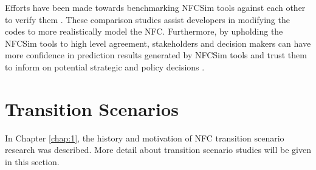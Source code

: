Efforts have been made towards benchmarking \gls{NFCSim} 
tools against each other to verify them 
\cite{feng_standardized_2016,guerin_benchmark_2009}. 
These comparison studies assist developers in modifying the
codes to more realistically model the \gls{NFC}. 
Furthermore, by upholding the \gls{NFCSim} tools to high level 
agreement, 
stakeholders and decision makers can have more confidence in 
prediction results generated by \gls{NFCSim} tools and trust them 
to inform on potential strategic and policy decisions
\cite{feng_standardized_2016}. 

\section{Transition Scenarios}
In Chapter \ref{chap:1}, the history and motivation of
\gls{NFC} transition scenario research was described.
More detail about transition scenario studies will be given 
in this section. 


